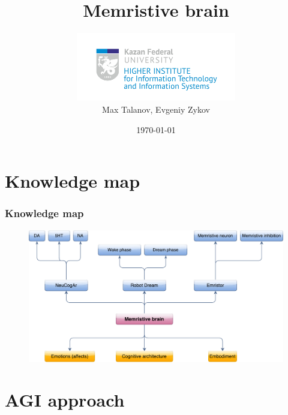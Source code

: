\documentclass[12pt, aspectratio=169]{beamer}
\title[Memristive brain]{Memristive brain} %
\author[Max Talanov, Evgeniy Zykov]{
  \includegraphics[height=3cm]{ITIS_logo_bright}\\
  Max Talanov, Evgeniy Zykov
}
\institute[ITIS: KFU] %
{
Machine cognition lab, Intellectual robotics department, ITIS \\ %
\medskip
\textit{max.talanov@gmail.com, evgeniy.zykov@kpfu.ru} %
}
\date{\today} %
\begin{document}
\begin{frame}
\titlepage %
\end{frame}


\section{Knowledge map}

\begin{frame}
\frametitle{Knowledge map}
\begin{figure}
\includegraphics[width=0.7\linewidth]{knowledge_map}
\end{figure}
\end{frame}

\section{AGI approach}
\end{document}
